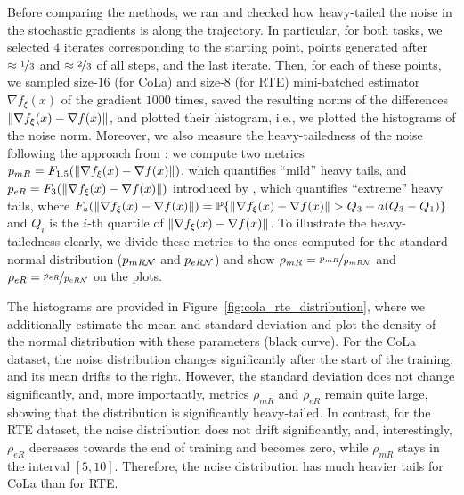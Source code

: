 \documentclass{article}
\begin{document}
Before comparing the methods, we ran  and checked how heavy-tailed the noise in the stochastic gradients is along the trajectory. In particular, for both tasks, we selected $4$ iterates corresponding to the starting point, points generated after $\approx \nicefrac{1}{3}$ and $\approx \nicefrac{2}{3}$ of all steps, and the last iterate. Then, for each of these points, we sampled size-$16$ (for CoLa) and size-8 (for RTE) mini-batched estimator $\nabla f_{\xi}(x)$ of the gradient $1000$ times, saved the resulting norms of the differences $\left\lVert\nabla f_{\xi}(x) - \nabla f(x)\right\rVert$, and plotted their histogram, i.e., we plotted the histograms of the noise norm. Moreover, we also measure the heavy-tailedness of the noise following the approach from \citep{gorbunov2022clipped}: we compute two metrics $p_{mR} = F_{1.5}(\left\lVert\nabla f_{\xi}(x) - \nabla f(x)\right\rVert)$, which quantifies ``mild'' heavy tails, and $p_{eR} = F_3(\left\lVert\nabla f_{\xi}(x) - \nabla f(x)\right\rVert)$ introduced by \citet{jordanova2017measuring}, which quantifies ``extreme'' heavy tails, where $F_{a}(\left\lVert\nabla f_{\xi}(x) - \nabla f(x)\right\rVert) = {\mathbb P}\{\left\lVert\nabla f_{\xi}(x) - \nabla f(x)\right\rVert > Q_3 + a(Q_3 - Q_1)\}$ and $Q_i$ is the $i$-th quartile of $\left\lVert\nabla f_{\xi}(x) - \nabla f(x)\right\rVert$. To illustrate the heavy-tailedness clearly, we divide these metrics to the ones computed for the standard normal distribution ($p_{mR{\cal N}}$ and $p_{eR{\cal N}}$) and show $\rho_{mR} = \nicefrac{p_{mR}}{p_{mR{\cal N}}}$ and $\rho_{eR} = \nicefrac{p_{eR}}{p_{eR{\cal N}}}$ on the plots.

The histograms are provided in Figure~\ref{fig:cola_rte_distribution}, where we additionally estimate the mean and standard deviation and plot the density of the normal distribution with these parameters (black curve).  For the CoLa dataset, the noise distribution changes significantly after the start of the training, and its mean drifts to the right. However, the standard deviation does not change significantly, and, more importantly, metrics $\rho_{mR}$ and $\rho_{eR}$ remain quite large, showing that the distribution is significantly heavy-tailed. In contrast, for the RTE dataset, the noise distribution does not drift significantly, and, interestingly, $\rho_{eR}$ decreases towards the end of training and becomes zero, while $\rho_{mR}$ stays in the interval $[5, 10]$. Therefore, the noise distribution has much heavier tails for CoLa than for RTE.
\end{document}
